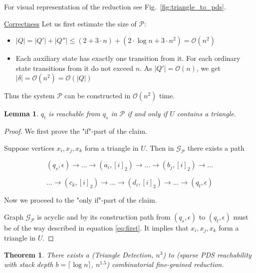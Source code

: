 \documentclass[12pt]{article}
\newtheorem{theorem}{Theorem}[section]
\newtheorem{lemma}{Lemma}[section]
\begin{document}
For visual representation of the reduction see Fig.~\ref{fig:triangle_to_pds}.


\underline{Correctness} Let us first estimate the size of $\mathcal{P}$:

\begin{itemize}
    \item $|Q| = |Q'| + |Q''| \le (2 + 3 \cdot n) + (2 \cdot \log n + 3 \cdot n^2) = \mathcal{O}(n^2)$
    \item Each auxiliary state has exactly one transition from it. For each ordinary state transitions from it do not exceed $n$. As $|Q'| = \mathcal{O}(n)$, we get $|\delta| = \mathcal{O}(n^2) = \mathcal{O}(|Q|)$ 
\end{itemize}

Thus the system $\mathcal{P}$ can be constructed in $\mathcal{O}(n^2)$ time.

\begin{lemma}
$q_t$ is reachable from $q_s$ in $\mathcal{P}$ if and only if $U$ contains a triangle.
\end{lemma}

\begin{proof}
We first prove the "if"-part of the claim. 

Suppose vertices $x_i, x_j, x_k$ form a triangle in $U$. Then in $\mathcal{G}_{\mathcal{P}}$ there exists a path 

$$(q_s, \epsilon) \rightarrow \ldots \rightarrow (a_i, [i]_2) \rightarrow \ldots \rightarrow (b_j, [i]_2) \rightarrow \ldots$$

\begin{equation}
\ldots \rightarrow (c_k, [i]_2) \rightarrow \ldots \rightarrow (d_i, [i]_2) \rightarrow \ldots \rightarrow (q_t, \epsilon)
\label{eq:first}
\end{equation}

Now we proceed to the "only if"-part of the claim.

Graph $\mathcal{G}_{\mathcal{P}}$ is acyclic and by its construction path from $(q_s, \epsilon)$ to $(q_t, \epsilon)$ must be of the way described in equation \eqref{eq:first}. It implies  that $x_i, x_j, x_k$ form a triangle in $U$.
\end{proof}

\begin{theorem}
There exists a (Triangle Detection, $n^3$) to (sparse PDS reachability with stack depth $b = \lceil \log n \rceil$, $n^{1.5}$) combinatorial fine-grained reduction. 
\end{theorem}
\end{document}
